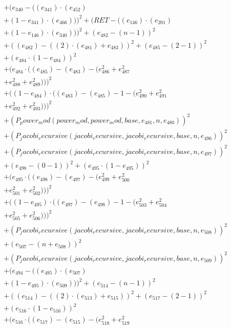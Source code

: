 \documentclass[10pt, a4paper]{article}
\begin{document}
\begin{small}
\begin{align*}
& + (e_{340} - ((e_{341})  \cdot  (e_{452}) \\
& + (1 - e_{341})  \cdot  (e_{466})))^{2} + (RET - ((e_{146})  \cdot  (e_{201}) \\
& + (1 - e_{146})  \cdot  (e_{340})))^{2} + (e_{482} - (n - 1))^{2} \\
& + ((e_{482}) - ((2)  \cdot  (e_{481}) + e_{483}))^{2} + (e_{485} - (2 - 1))^{2} \\
& + (e_{484}  \cdot  (1 - e_{484}))^{2} \\
& + (e_{484}  \cdot  ((e_{485}) - (e_{483}) - (e_{486}^{2} + e_{487}^{2} \\
& + e_{488}^{2} + e_{489}^{2})))^{2} \\
& + ((1 - e_{484})  \cdot  ((e_{483}) - (e_{485}) - 1 - (e_{490}^{2} + e_{491}^{2} \\
& + e_{492}^{2} + e_{493}^{2})))^{2} \\
& + (P_power_mod(power_mod, power_mod, base, e_{481}, n, e_{480}))^{2} \\
& + (P_jacobi_recursive(jacobi_recursive, jacobi_recursive, base, n, e_{496}))^{2} \\
& + (P_jacobi_recursive(jacobi_recursive, jacobi_recursive, base, n, e_{497}))^{2} \\
& + (e_{498} - (0 - 1))^{2} + (e_{495}  \cdot  (1 - e_{495}))^{2} \\
& + (e_{495}  \cdot  ((e_{498}) - (e_{497}) - (e_{499}^{2} + e_{500}^{2} \\
& + e_{501}^{2} + e_{502}^{2})))^{2} \\
& + ((1 - e_{495})  \cdot  ((e_{497}) - (e_{498}) - 1 - (e_{503}^{2} + e_{504}^{2} \\
& + e_{505}^{2} + e_{506}^{2})))^{2} \\
& + (P_jacobi_recursive(jacobi_recursive, jacobi_recursive, base, n, e_{508}))^{2} \\
& + (e_{507} - (n + e_{508}))^{2} \\
& + (P_jacobi_recursive(jacobi_recursive, jacobi_recursive, base, n, e_{509}))^{2} \\
& + (e_{494} - ((e_{495})  \cdot  (e_{507}) \\
& + (1 - e_{495})  \cdot  (e_{509})))^{2} + (e_{514} - (n - 1))^{2} \\
& + ((e_{514}) - ((2)  \cdot  (e_{513}) + e_{515}))^{2} + (e_{517} - (2 - 1))^{2} \\
& + (e_{516}  \cdot  (1 - e_{516}))^{2} \\
& + (e_{516}  \cdot  ((e_{517}) - (e_{515}) - (e_{518}^{2} + e_{519}^{2} \\

\end{align*}
\end{small}
\end{document}
